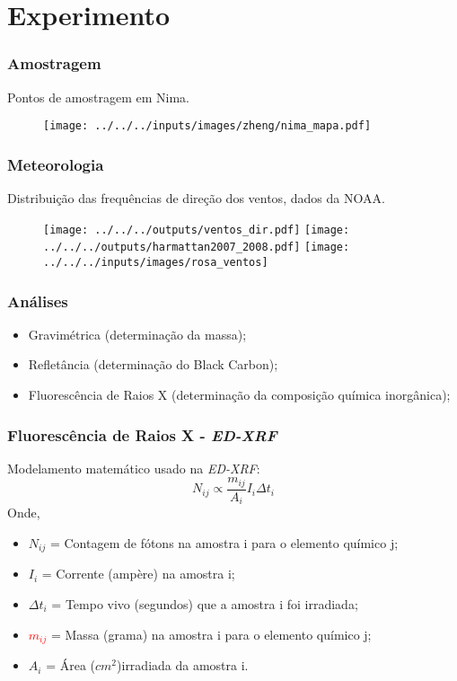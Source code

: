 \section{Experimento}

\begin{frame}
  \frametitle{Amostragem}
  Pontos de amostragem em Nima.
  \begin{figure}[H]
    \centering
    \texttt{[image: ../../../inputs/images/zheng/nima\_mapa.pdf]}
  \end{figure}
\end{frame}

\begin{frame}
  \frametitle{Meteorologia}
  Distribuição das frequências de direção dos ventos, dados da NOAA.
  \begin{figure}[H]
    \centering
      \texttt{[image: ../../../outputs/ventos\_dir.pdf]}
      \texttt{[image: ../../../outputs/harmattan2007\_2008.pdf]}
      \texttt{[image: ../../../inputs/images/rosa\_ventos]}
  \end{figure}
\end{frame}

\begin{frame}
  \frametitle{Análises}
  \begin{itemize}
    \item Gravimétrica (determinação da massa);  
    \item Refletância (determinação do Black Carbon);
    \item Fluorescência de Raios X (determinação da composição química inorgânica);
  \end{itemize}
\end{frame}

\begin{frame}
  \frametitle{Fluorescência de Raios X - \textit{ED-XRF}}
  Modelamento matemático usado na \textit{ED-XRF}:
  \begin{equation}
	  N_{ij} \propto \frac{m_{ij}}{A_i}I_i{\Delta}t_{i}
  \end{equation}
  Onde,  
  \begin{itemize}
    \item $N_{ij}$ = Contagem de fótons na amostra i para o elemento químico j;
    \item $I_{i}$ = Corrente (ampère) na amostra i;
    \item $\Delta t_i$ = Tempo vivo (segundos) que a amostra i foi irradiada;
    \item \textcolor{red}{$m_{ij}$} = Massa (grama) na amostra i para o elemento químico j;
    \item $A_i$ = Área ($cm^2$)irradiada da amostra i.
  \end{itemize}
\end{frame}

